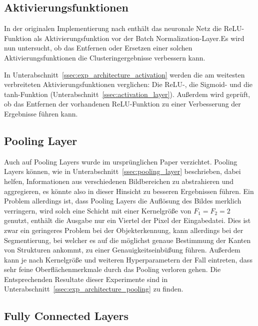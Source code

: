 
\subsection{Aktivierungsfunktionen}
\label{ssec:network_architecture_activation}

In der originalen Implementierung nach \cite{kanezaki_18} enthält das neuronale Netz die ReLU-Funktion als Aktivierungsfunktion vor der Batch Normalization-Layer.Es wird nun untersucht, ob das Entfernen oder Ersetzen einer solchen Aktivierungsfunktionen die Clusteringergebnisse verbessern kann.

In Unterabschnitt~\ref{ssec:exp_architecture_activation} werden die am weitesten verbreiteten Aktivierungsfunktionen verglichen: Die ReLU-, die Sigmoid- und die tanh-Funktion (\vgl Unterabschnitt~\ref{ssec:activation_layer}). Außerdem wird geprüft, ob das Entfernen der vorhandenen ReLU-Funktion zu einer Verbesserung der Ergebnisse führen kann.

\subsection{Pooling Layer}
\label{ssec:network_architecture_pooling}

Auch auf Pooling Layers wurde im ursprünglichen Paper verzichtet. Pooling Layers können, wie in Unterabschnitt~\ref{ssec:pooling_layer} beschrieben, dabei helfen, Informationen aus verschiedenen Bildbereichen zu abstrahieren und aggregieren, es könnte also in dieser Hinsicht zu besseren Ergebnissen führen. Ein Problem allerdings ist, dass Pooling Layers die Auflösung des Bildes merklich verringern, wird solch eine Schicht \bspw mit einer Kernelgröße von $F_1=F_2=2$ genutzt, enthält die Ausgabe nur ein Viertel der Pixel der Eingabedatei. Dies ist zwar ein geringeres Problem bei der Objekterkennung, kann allerdings bei der Segmentierung, bei welcher es auf die möglichst genaue Bestimmung der Kanten von Strukturen ankommt, zu einer Genauigkeitseinbüßung führen. Außerdem kann je nach Kernelgröße und weiteren Hyperparametern der Fall eintreten, dass sehr feine Oberflächenmerkmale durch das Pooling verloren gehen. Die Entsprechenden Resultate dieser Experimente sind in Unterabschnitt~\ref{ssec:exp_architecture_pooling} zu finden.

\subsection{Fully Connected Layers}
\label{ssec:network_architecture_fully_connected}

